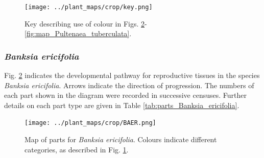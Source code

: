 \documentclass[10pt,twoside]{article}\usepackage[]{graphicx}\usepackage[]{color}
\begin{document}
\begin{figure}[h]
\centering
\texttt{[image: ../plant\_maps/crop/key.png]}
\caption{Key describing use of colour in Figs. \ref{fig:map_Banksia_ericifolia}-\ref{fig:map_Pultenaea_tuberculata}.}
\label{fig:map_key}
\end{figure}
\clearpage

\subsubsection{\emph{Banksia ericifolia}}

Fig. \ref{fig:map_Banksia_ericifolia} indicates the developmental pathway for reproductive tissues in the species \emph{Banksia ericifolia}. Arrows indicate the direction of progression.  The numbers of each part shown in the diagram were recorded in successive censuses. Further details on each part type are given in Table \ref{tab:parts_Banksia_ericifolia}.

\begin{figure}[h]
\centering
\texttt{[image: ../plant\_maps/crop/BAER.png]}
\caption{Map of parts for \emph{Banksia ericifolia}. Colours indicate different categories, as described in Fig. \ref{fig:map_key}.}
\label{fig:map_Banksia_ericifolia}
\end{figure}
\end{document}
